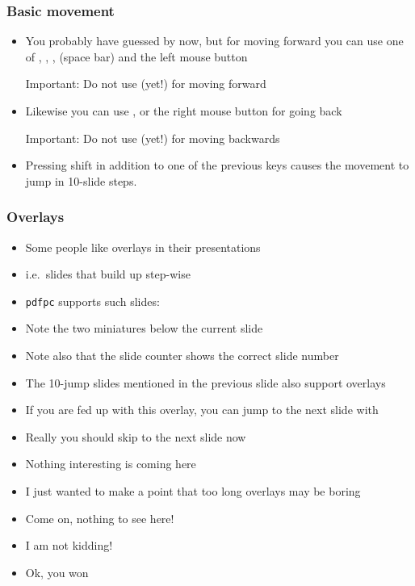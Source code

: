 \documentclass{beamer}
\newcommand{\pdfpc}{\texttt{pdfpc}\xspace}
\begin{document}
\begin{frame}
  \frametitle{Basic movement}
  \begin{itemize}
    \item You probably have guessed by now, but for moving forward you can use
      one of \RArrow, \PgUp, \Return, \Spacebar (space bar) and the left mouse
      button

      \alert{Important:} Do not use \DArrow (yet!) for moving forward
    \item Likewise you can use \LArrow, \PgDown or the right mouse button for
      going back

      \alert{Important:} Do not use \UArrow (yet!) for moving backwards
    \item Pressing shift in addition to one of the previous keys
      causes the movement to jump in 10-slide steps.
  \end{itemize}
\end{frame}

\begin{frame}
  \frametitle{Overlays}
  \begin{itemize}
    \item Some people like overlays in their presentations
    \pause
    \item i.e.\ slides that build up step-wise
    \pause
    \item \pdfpc supports such slides:
    \pause
    \item Note the two miniatures below the current slide
    \pause
    \item Note also that the slide counter shows the correct slide number
    \pause
    \item The 10-jump slides mentioned in the previous slide also support
      overlays
    \pause
    \item If you are fed up with this overlay, you can jump to the next slide
      with \DArrow
    \pause
    \item Really you should skip to the next slide now
    \pause
    \item Nothing interesting is coming here
    \pause
    \item I just wanted to make a point that too long overlays may be boring
    \pause
    \item Come on, nothing to see here!
    \pause
    \item I am not kidding!
    \pause
    \item Ok, you won
  \end{itemize}
\end{frame}
\end{document}
